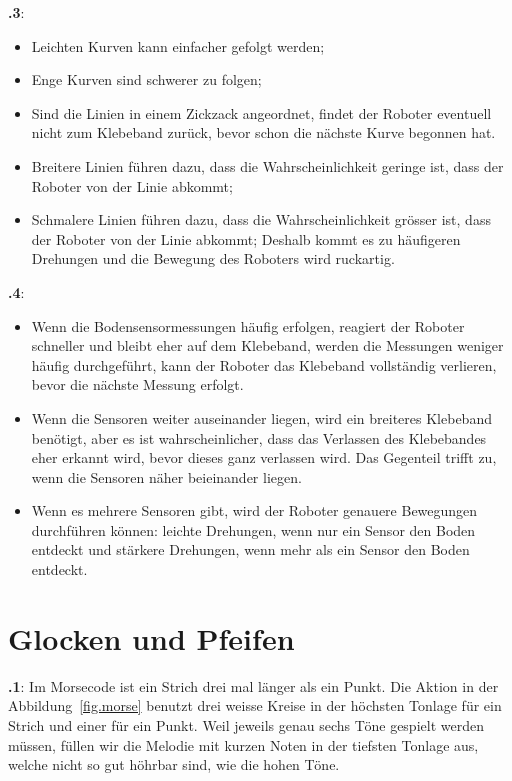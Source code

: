 \documentclass[12pt,a4paper,english]{article}
\begin{document}
\textbf{\thesection.3}:
\begin{itemize}
\item Leichten Kurven kann einfacher gefolgt werden;
\item Enge Kurven sind schwerer zu folgen; 
\item Sind die Linien in einem Zickzack angeordnet, findet der Roboter eventuell nicht zum Klebeband zurück, bevor schon die nächste Kurve begonnen hat.
\item Breitere Linien führen dazu, dass die Wahrscheinlichkeit geringe ist, dass der Roboter von der Linie abkommt; 
\item Schmalere Linien führen dazu, dass die Wahrscheinlichkeit grösser ist, dass der Roboter von der Linie abkommt;
Deshalb kommt es zu häufigeren Drehungen und die Bewegung des Roboters wird ruckartig.
\end{itemize}


\textbf{\thesection.4}:
\begin{itemize}
\item Wenn die Bodensensormessungen häufig erfolgen, reagiert der Roboter schneller und bleibt eher auf dem Klebeband, werden die Messungen weniger häufig durchgeführt, kann der Roboter das Klebeband vollständig verlieren, bevor die nächste Messung erfolgt.
\item Wenn die Sensoren weiter auseinander liegen, wird ein breiteres Klebeband benötigt, aber es ist wahrscheinlicher, dass das Verlassen des Klebebandes eher erkannt wird, bevor dieses ganz verlassen wird. Das Gegenteil trifft zu, wenn die Sensoren näher beieinander liegen.
\item Wenn es mehrere Sensoren gibt, wird der Roboter genauere Bewegungen durchführen können: leichte Drehungen, wenn nur ein Sensor den Boden entdeckt und stärkere Drehungen, wenn mehr als ein Sensor den Boden entdeckt.
\end{itemize}

\section{Glocken und Pfeifen}

\textbf{\thesection.1}: Im Morsecode ist ein Strich drei mal länger als ein Punkt. Die Aktion in der Abbildung~\ref{fig.morse} benutzt drei weisse Kreise in der höchsten Tonlage für ein Strich und einer für ein Punkt. Weil jeweils genau sechs Töne gespielt werden müssen, füllen wir die Melodie mit kurzen Noten in der tiefsten Tonlage aus, welche nicht so gut höhrbar sind, wie die hohen Töne.
\end{document}
